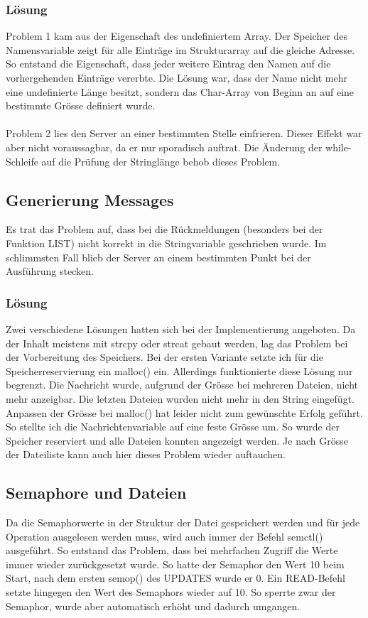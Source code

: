 \documentclass[12pt,a4paper,ngerman]{report}
\begin{document}
\subsubsection{Lösung}
Problem 1 kam aus der Eigenschaft des undefiniertem Array. Der Speicher des Namensvariable zeigt für alle Einträge im Strukturarray auf die gleiche Adresse. So entstand die Eigenschaft, dass jeder weitere Eintrag den Namen auf die vorhergehenden Einträge vererbte. Die Lösung war, dass der Name nicht mehr eine undefinierte Länge besitzt, sondern das Char-Array von Beginn an auf eine bestimmte Grösse definiert wurde.\\
\\
Problem 2 lies den Server an einer bestimmten Stelle einfrieren. Dieser Effekt war aber nicht voraussagbar, da er nur sporadisch auftrat. Die Änderung der while-Schleife auf die Prüfung der Stringlänge behob dieses Problem. 
\subsection{Generierung Messages}
Es trat das Problem auf, dass bei die Rückmeldungen (besonders bei der Funktion LIST) nicht korrekt in die Stringvariable geschrieben wurde. Im schlimmsten Fall blieb der Server an einem bestimmten Punkt bei der Ausführung stecken.
\subsubsection{Lösung}
Zwei verschiedene Lösungen hatten sich bei der Implementierung angeboten. Da der Inhalt meistens mit strcpy oder strcat gebaut werden, lag das Problem bei der Vorbereitung des Speichers. Bei der ersten Variante setzte ich für die Speicherreservierung ein malloc() ein. Allerdings funktionierte diese Lösung nur begrenzt. Die Nachricht wurde, aufgrund der Grösse bei mehreren Dateien, nicht mehr anzeigbar. Die letzten Dateien wurden nicht mehr in den String eingefügt. Anpassen der Grösse bei malloc() hat leider nicht zum gewünschte Erfolg geführt. So stellte ich die Nachrichtenvariable auf eine feste Grösse um. So wurde der Speicher reserviert und alle Dateien konnten angezeigt werden. Je nach Grösse der Dateiliste kann auch hier dieses Problem wieder auftauchen.
\newpage
\subsection{Semaphore und Dateien}
Da die Semaphorwerte in der Struktur der Datei gespeichert werden und für jede Operation ausgelesen werden muss, wird auch immer der Befehl semctl() ausgeführt. So entstand das Problem, dass bei mehrfachen Zugriff die Werte immer wieder zurückgesetzt wurde. So hatte der Semaphor den Wert 10 beim Start, nach dem ersten semop() des UPDATES wurde er 0. Ein READ-Befehl setzte hingegen den Wert des Semaphors wieder auf 10. So sperrte zwar der Semaphor, wurde aber automatisch erhöht und dadurch umgangen.
\end{document}
